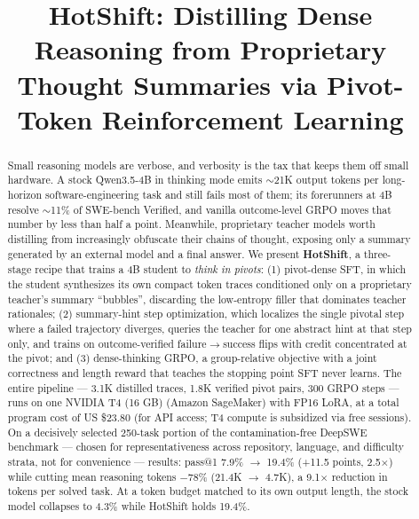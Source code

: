 \documentclass[conference]{IEEEtran}
\begin{document}
\title{HotShift: Distilling Dense Reasoning from Proprietary Thought Summaries via Pivot-Token Reinforcement Learning}

\author{
}

\maketitle

\begin{abstract}
Small reasoning models are verbose, and verbosity is the tax that keeps them off small hardware. A stock Qwen3.5-4B in thinking mode emits $\sim$21K output tokens per long-horizon software-engineering task and still fails most of them; its forerunners at 4B resolve $\sim$11\% of SWE-bench Verified, and vanilla outcome-level GRPO moves that number by less than half a point. Meanwhile, proprietary teacher models worth distilling from increasingly obfuscate their chains of thought, exposing only a summary generated by an external model and a final answer. We present \textbf{HotShift}, a three-stage recipe that trains a 4B student to \textit{think in pivots}: (1) pivot-dense SFT, in which the student synthesizes its own compact token traces conditioned only on a proprietary teacher's summary ``bubbles'', discarding the low-entropy filler that dominates teacher rationales; (2) summary-hint step optimization, which localizes the single pivotal step where a failed trajectory diverges, queries the teacher for one abstract hint at that step only, and trains on outcome-verified failure$\to$success flips with credit concentrated at the pivot; and (3) dense-thinking GRPO, a group-relative objective with a joint correctness and length reward that teaches the stopping point SFT never learns. The entire pipeline --- 3.1K distilled traces, 1.8K verified pivot pairs, 300 GRPO steps --- runs on one NVIDIA T4 (16 GB) (Amazon SageMaker) with FP16 LoRA, at a total program cost of US \$23.80 (for API access; T4 compute is subsidized via free sessions). On a decisively selected 250-task portion of the contamination-free DeepSWE benchmark --- chosen for representativeness across repository, language, and difficulty strata, not for convenience --- results: pass@1 7.9\% $\to$ 19.4\% (+11.5 points, 2.5$\times$) while cutting mean reasoning tokens $-$78\% (21.4K $\to$ 4.7K), a 9.1$\times$ reduction in tokens per solved task. At a token budget matched to its own output length, the stock model collapses to 4.3\% while HotShift holds 19.4\%.
\end{abstract}
\end{document}
